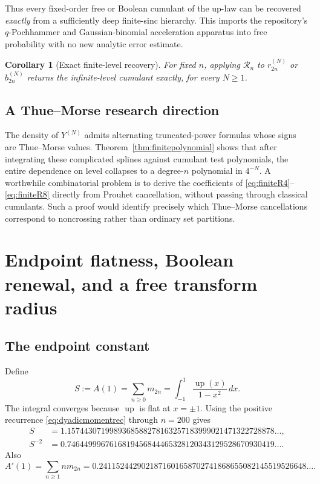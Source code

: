 \documentclass[11pt]{article}
\newtheorem{corollary}[theorem]{Corollary}
\theoremstyle{definition}
\newcommand{\Up}{\operatorname{up}}
\begin{document}
Thus every fixed-order free or Boolean cumulant of the up-law can be recovered \emph{exactly} from a sufficiently deep finite-sinc hierarchy. This imports the repository's \(q\)-Pochhammer and Gaussian-binomial acceleration apparatus into free probability with no new analytic error estimate.

\begin{corollary}[Exact finite-level recovery]\label{cor:exactrecovery}
For fixed \(n\), applying \(\mathcal R_n\) to \(r_{2n}^{(N)}\) or \(b_{2n}^{(N)}\) returns the infinite-level cumulant exactly, for every \(N\ge1\).
\end{corollary}

\subsection{A Thue--Morse research direction}
The density of \(Y^{(N)}\) admits alternating truncated-power formulas whose signs are Thue--Morse values. Theorem~\ref{thm:finitepolynomial} shows that after integrating these complicated splines against cumulant test polynomials, the entire dependence on level collapses to a degree-\(n\) polynomial in \(4^{-N}\). A worthwhile combinatorial problem is to derive the coefficients of \eqref{eq:finiteR4}--\eqref{eq:finiteR8} directly from Prouhet cancellation, without passing through classical cumulants. Such a proof would identify precisely which Thue--Morse cancellations correspond to noncrossing rather than ordinary set partitions.

\section{Endpoint flatness, Boolean renewal, and a free transform radius}
\subsection{The endpoint constant}
Define
\begin{equation}\label{eq:Sconstant}
S:=A(1)=\sum_{n\ge0}m_{2n}
=\int_{-1}^1\frac{\Up(x)}{1-x^2}\,dx.
\end{equation}
The integral converges because \(\Up\) is flat at \(x=\pm1\). Using the positive recurrence \eqref{eq:dyadicmomentrec} through \(n=200\) gives
\begin{align}
S&=1.1574430719989368588278163257183999021471322728878\ldots,
\label{eq:Svalue}\\
S^{-2}&=0.7464499967616819456844465328120343129528670930419\ldots.
\label{eq:Sinv2}
\end{align}
Also
\begin{equation}\label{eq:Aprime}
A'(1)=\sum_{n\ge1}nm_{2n}
=0.2411524429021871601658702741868655082145519526648\ldots.
\end{equation}
\end{document}
